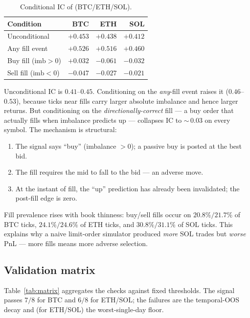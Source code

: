 \documentclass[11pt]{article}
\newcommand{\toprule}{\hline}
\newcommand{\midrule}{\hline}
\newcommand{\bottomrule}{\hline}
\newcommand{\code}[1]{\texttt{\detokenize{#1}}}
\newcommand{\ic}{\textnormal{IC}}
\begin{document}
\begin{table}[h]
\centering\footnotesize
\caption{Conditional \ic{} of \code{imbalance_qty_l1} (BTC/ETH/SOL).}
\label{tab:conditional}
\begin{tabular}{lrrr}
\toprule
Condition & BTC & ETH & SOL \\
\midrule
Unconditional         & $+0.453$ & $+0.438$ & $+0.412$ \\
Any fill event        & $+0.526$ & $+0.516$ & $+0.460$ \\
Buy fill ($\text{imb}>0$) & $+0.032$ & $-0.061$ & $-0.032$ \\
Sell fill ($\text{imb}<0$)& $-0.047$ & $-0.027$ & $-0.021$ \\
\bottomrule
\end{tabular}
\end{table}

Unconditional \ic{} is $0.41$--$0.45$. Conditioning on the \emph{any}-fill event raises it
($0.46$--$0.53$), because ticks near fills carry larger absolute imbalance and hence larger
returns. But conditioning on the \emph{directionally-correct} fill --- a buy order that
actually fills when imbalance predicts up --- collapses \ic{} to $\sim$\,$0.03$ on every
symbol. The mechanism is structural:
\begin{enumerate}
  \item The signal says ``buy'' (imbalance $> 0$); a passive buy is posted at the best bid.
  \item The fill requires the mid to fall to the bid --- an adverse move.
  \item At the instant of fill, the ``up'' prediction has already been invalidated; the
        post-fill edge is zero.
\end{enumerate}
Fill prevalence rises with book thinness: buy/sell fills occur on $20.8\%/21.7\%$ of BTC
ticks, $24.1\%/24.6\%$ of ETH ticks, and $30.8\%/31.1\%$ of SOL ticks. This explains why a
naive limit-order simulator produced \emph{more} SOL trades but \emph{worse} PnL --- more
fills means more adverse selection.

\subsection{Validation matrix}
Table~\ref{tab:matrix} aggregates the checks against fixed thresholds. The signal passes
$7/8$ for BTC and $6/8$ for ETH/SOL; the failures are the temporal-OOS decay and (for
ETH/SOL) the worst-single-day floor.
\end{document}
